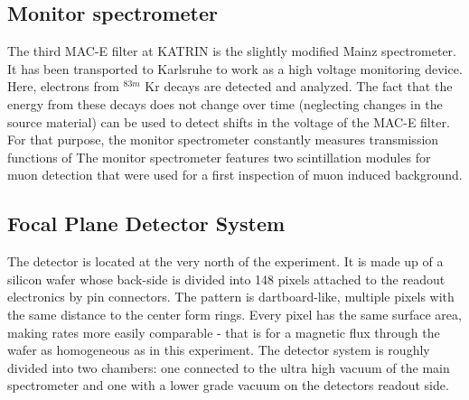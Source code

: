       \subsection{Monitor spectrometer}
      \label{ch:TheKATRINexperiment:sec:experimentalSetup:subsec:monSpec}
      
      The third MAC-E filter at KATRIN is the slightly modified Mainz spectrometer. It has been transported to Karlsruhe to work as a high voltage monitoring device. Here, electrons from $^{83m}$ Kr decays are detected and analyzed. The fact that the energy from these decays does not change over time (neglecting changes in the source material) can be used to detect shifts in the voltage of the MAC-E filter. For that purpose, the monitor spectrometer constantly measures transmission functions of 
      The monitor spectrometer features two scintillation modules for muon detection that were used for a first inspection of muon induced background.

     
      \subsection{Focal Plane Detector System}
      \label{ch:The KATRIN experiment:sec:Experimental setup:subsec:FPD system}
      The detector is located at the very north of the experiment. It is made up of a silicon wafer whose back-side is divided into 148 pixels attached to the readout electronics by pin connectors. The pattern is dartboard-like, multiple pixels with the same distance to the center form rings. Every pixel has the same surface area, making rates more easily comparable - that is for a magnetic flux through the wafer as homogeneous as in this experiment.
      The detector system is roughly divided into two chambers: one connected to the ultra high vacuum of the main spectrometer and one with a lower grade vacuum on the detectors readout side.
      
